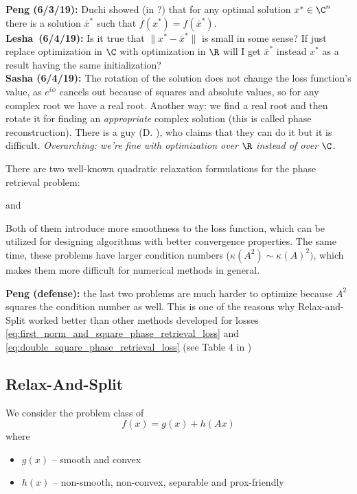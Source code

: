 \documentclass[11pt,letterpaper]{article}
\newcommand{\userId}{Lesha}
\newcommand{\Peng}[1]{\textbf{Peng (#1):}}
\newcommand{\Sasha}[1]{\textbf{Sasha (#1):}}
\newcommand{\Lesha}[1]{\textbf{\userId\ (#1):}}
\numberwithin{equation}{section} %
\numberwithin{figure}{section} %
\numberwithin{table}{section} %
\begin{document}
\begin{tip}
\Peng{6/3/19} Duchi showed (in \cite{Duchi2017PhaseRetrival}?) that for any optimal solution $x^* \in \C^n$ there is a solution $\bar{x}^*$ such that $f(x^*) = f(\bar{x}^*)$.  \\
\Lesha{6/4/19} Is it true that $\|x^* - \bar{x}^*\|$ is small in some sense? If just replace optimization in $\C$ with optimization in $\R$ will I get $\bar{x}^*$ instead $x^*$ as a result having the same initialization? \\
\Sasha{6/4/19} The rotation of the solution does not change the loss function's value, as $e^{i\phi}$ cancels out because of squares and absolute values, so for any complex root we have a real root. Another way: we find a real root and then rotate it for finding an \textit{appropriate} complex solution (this is called phase reconstruction). There is a guy (D. ), who claims that they can do it but it is difficult. \textit{Overarching: we're fine with optimization over $\R$ instead of over $\C$.}
\end{tip}

There are two well-known quadratic relaxation formulations for the phase retrieval problem:


and 


Both of them introduce more smoothness to the loss function, which can be utilized for designing algorithms with better convergence properties. The same time, these problems have larger condition numbers ($\kappa(A^2) \sim \kappa(A)^2)$, which makes them more difficult for numerical methods in general.  

\begin{tip}
\Peng{defense} the last two problems are much harder to optimize because $A^2$ squares the condition number as well. This is one of the reasons why Relax-and-Split worked better than other methods developed for losses \ref{eq:first_norm_and_square_phase_retrieval_loss} and \ref{eq:double_square_phase_retrieval_loss} (see Table 4 in \cite{Zheng2018RelaxAndSplit})    
\end{tip}

\subsection*{Relax-And-Split}
     We consider the problem class of
    \[
        f(x) = g(x) + h(Ax)
    \]
    where 
    \begin{itemize}
        \item $g(x)$ -- smooth and convex 
        \item $h(x)$ -- non-smooth, non-convex, separable and prox-friendly 
    \end{itemize}
    
\end{document}
